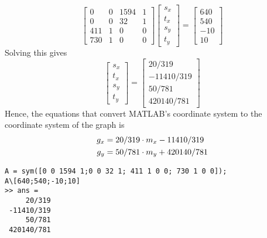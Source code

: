 \documentclass[a4paper]{article}
\begin{document}
\begin{equation}
	\begin{bmatrix}
		 0 & 0 & 1594 & 1\\
		 0 & 0 & 32 & 1\\
		 411 & 1 & 0 & 0\\
		 730 & 1 & 0 & 0
	\end{bmatrix}
	\begin{bmatrix}
		s_x\\t_x\\s_y\\t_y
	\end{bmatrix}
	=
	\begin{bmatrix}
		640\\540\\-10\\10
	\end{bmatrix}
\end{equation}
Solving this gives 
\begin{equation}
	\begin{bmatrix}
		s_x\\t_x\\s_y\\t_y
	\end{bmatrix}
	=
	\begin{bmatrix}
		20/319\\-11410/319\\50/781\\420140/781
	\end{bmatrix}
\end{equation}
Hence, the equations that convert MATLAB's coordinate system to the coordinate system of the graph is
\begin{equation}{\label{eq:conversion}}
	\begin{aligned}
		g_x &=  20/319 \cdot m_x - 11410/319\\
		g_y &=  50/781 \cdot m_y + 420140/781
	\end{aligned}
\end{equation}
\begin{verbatim}
A = sym([0 0 1594 1;0 0 32 1; 411 1 0 0; 730 1 0 0]);
A\[640;540;-10;10]
>> ans =
     20/319
 -11410/319
     50/781
 420140/781
\end{verbatim}
\begin{comment}
	>> A = sym([0 0 1594 1;0 0 32 1; 411 1 0 0; 730 1 0 0])
	 
	A =
	 
	[   0, 0, 1594, 1]
	[   0, 0,   32, 1]
	[ 411, 1,    0, 0]
	[ 730, 1,    0, 0]
	 
	>> B = inv(A)
	 
	B =
	 
	[       0,       0,  -1/319,    1/319]
	[       0,       0, 730/319, -411/319]
	[  1/1562, -1/1562,       0,        0]
	[ -16/781, 797/781,       0,        0]
	 
	>> B*[640;540;-10;10]
	 
	ans =
	 
	     20/319
	 -11410/319
	     50/781
	 420140/781
\end{comment}
\end{document}
